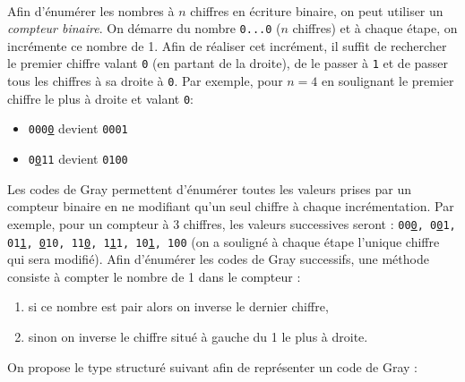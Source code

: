 \documentclass[11pt,a4paper]{article}
\begin{document}
\begin{Exercise}[title={Code de Gray}]\\
	Afin d'énumérer les nombres à $n$ chiffres en écriture binaire, on peut utiliser un \textit{compteur binaire}. On démarre du nombre {\tt 0...0} ($n$ chiffres) et à chaque étape, on incrémente ce nombre de 1. Afin de réaliser cet incrément, il suffit de rechercher le premier chiffre valant {\tt 0} (en partant de la droite), de le passer à {\tt 1} et de passer tous les chiffres à sa droite à {\tt 0}. Par exemple, pour $n=4$ en soulignant le premier chiffre le plus à droite et valant {\tt 0}:
	\begin{itemize}
		\item {\tt 000\underline{0}} devient {\tt 0001}
		\item {\tt 0\underline{0}11} devient {\tt 0100}
	\end{itemize}
	\smallskip

	\NRet
	Les codes de Gray permettent d'énumérer toutes les valeurs prises par un compteur binaire en ne modifiant qu'un seul chiffre à chaque incrémentation. Par exemple, pour un compteur à 3 chiffres, les valeurs successives seront : {\tt 00\underline{0}, 0\underline{0}1, 01\underline{1}, \underline{0}10, 11\underline{0}, 1\underline{1}1, 10\underline{1}, 100} (on a souligné à chaque étape l'unique chiffre qui sera modifié). Afin d'énumérer les codes de Gray successifs, une méthode consiste à compter le nombre de 1 dans le compteur :
	\begin{enumerate}
		\item si ce nombre est pair alors on inverse le dernier chiffre,
		\item sinon on inverse le chiffre situé à gauche du 1 le plus à droite.
	\end{enumerate}
	On propose le type structuré suivant afin de représenter un code de Gray :
	\Ret
\end{Exercise}
\end{document}
